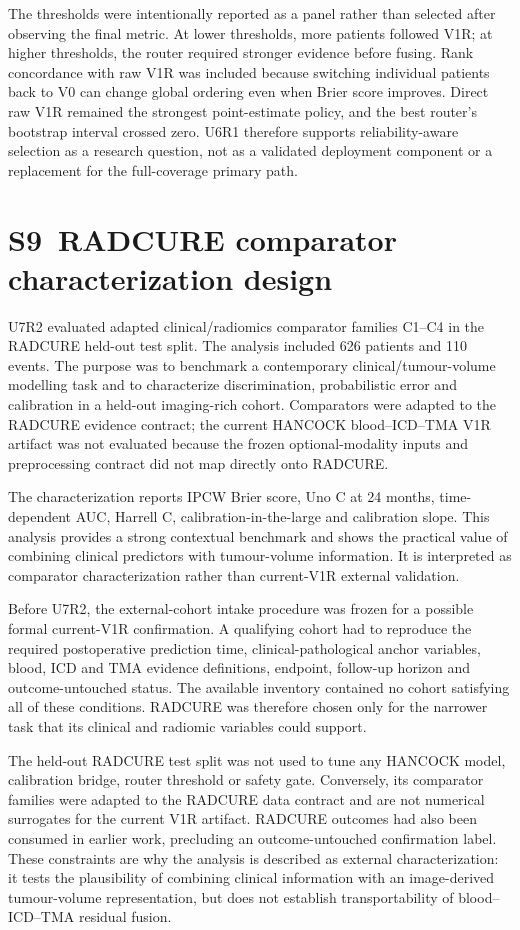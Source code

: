 The thresholds were intentionally reported as a panel rather than selected after observing the final metric. At lower thresholds, more patients followed V1R; at higher thresholds, the router required stronger evidence before fusing. Rank concordance with raw V1R was included because switching individual patients back to V0 can change global ordering even when Brier score improves. Direct raw V1R remained the strongest point-estimate policy, and the best router's bootstrap interval crossed zero. U6R1 therefore supports reliability-aware selection as a research question, not as a validated deployment component or a replacement for the full-coverage primary path.

\section*{S9~RADCURE comparator characterization design}
U7R2 evaluated adapted clinical/radiomics comparator families C1--C4 in the RADCURE held-out test split. The analysis included 626 patients and 110 events. The purpose was to benchmark a contemporary clinical/tumour-volume modelling task and to characterize discrimination, probabilistic error and calibration in a held-out imaging-rich cohort. Comparators were adapted to the RADCURE evidence contract; the current HANCOCK blood--ICD--TMA V1R artifact was not evaluated because the frozen optional-modality inputs and preprocessing contract did not map directly onto RADCURE.

The characterization reports IPCW Brier score, Uno C at 24 months, time-dependent AUC, Harrell C, calibration-in-the-large and calibration slope. This analysis provides a strong contextual benchmark and shows the practical value of combining clinical predictors with tumour-volume information. It is interpreted as comparator characterization rather than current-V1R external validation.

Before U7R2, the external-cohort intake procedure was frozen for a possible formal current-V1R confirmation. A qualifying cohort had to reproduce the required postoperative prediction time, clinical-pathological anchor variables, blood, ICD and TMA evidence definitions, endpoint, follow-up horizon and outcome-untouched status. The available inventory contained no cohort satisfying all of these conditions. RADCURE was therefore chosen only for the narrower task that its clinical and radiomic variables could support.

The held-out RADCURE test split was not used to tune any HANCOCK model, calibration bridge, router threshold or safety gate. Conversely, its comparator families were adapted to the RADCURE data contract and are not numerical surrogates for the current V1R artifact. RADCURE outcomes had also been consumed in earlier work, precluding an outcome-untouched confirmation label. These constraints are why the analysis is described as external characterization: it tests the plausibility of combining clinical information with an image-derived tumour-volume representation, but does not establish transportability of blood--ICD--TMA residual fusion.

